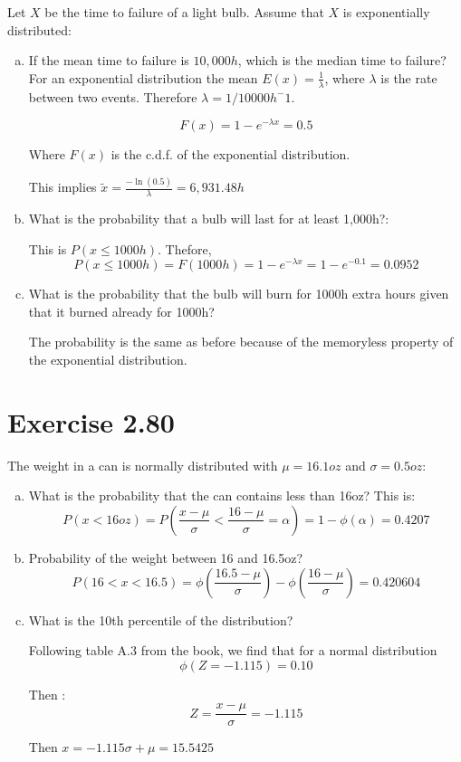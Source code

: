 \documentclass[10pt]{article}
\begin{document}
  Let $X$ be the time to failure of a light bulb. Assume that $X$ is exponentially distributed:
    \begin{enumerate}[a.]
      \item If the mean time to failure is $10,000h$, which is the median time to failure? 
            For an exponential distribution the mean $E(x)=\frac{1}{\lambda}$, where $\lambda$ is the
            rate between two events. Therefore $\lambda=1/10000 h^-1$.
    
            \[
             F(x) = 1-e^{-\lambda x} = 0.5 
            \]

            Where $F(x)$ is the c.d.f. of the exponential distribution.
  
            This implies $ \tilde{x} = \frac{-\ln(0.5)}{\lambda}=6,931.48h$ 
    
      \item What is the probability that a bulb will last for at least 1,000h?:
  
            This is $P(x \leq 1000h)$. Thefore,
            \[
            P(x \leq 1000h) = F(1000h) = 1-e^{-\lambda x} = 1-e^{-0.1} = 0.0952
            \]
  
      \item What is the probability that the bulb will burn for 1000h extra hours
            given that it burned already for 1000h? 

            The probability is the same as before because of the memoryless property
            of the exponential distribution.

    \end{enumerate}

\section{Exercise 2.80}
    The weight in a can is normally distributed with $\mu=16.1oz$ and $\sigma=0.5oz$:

  \begin{enumerate}[a.]
    \item What is the probability that the can contains less than 16oz?
          This is:
          \[
          P(x < 16oz) = P(\frac{x-\mu}{\sigma} < \frac{16-\mu}{\sigma}=\alpha) = 1 - \phi(\alpha) = 0.4207
          \]
    \item Probability of the weight between 16 and 16.5oz? 
          \[
          P(16 < x <16.5) = \phi( \frac{16.5-\mu}{\sigma}) -\phi( \frac{16-\mu}{\sigma}) = 0.420604
          \]

    \item What is the 10th percentile of the distribution?

          Following table A.3 from the book, we find that for a normal distribution
          \[
            \phi(Z=-1.115 ) =0.10
          \]

            Then :
          \[
            Z = \frac{x-\mu}{\sigma} = -1.115 
          \]

          Then $x = {-1.115 \sigma +\mu} = 15.5425 $

  \end{enumerate}
  
  
\end{document}
